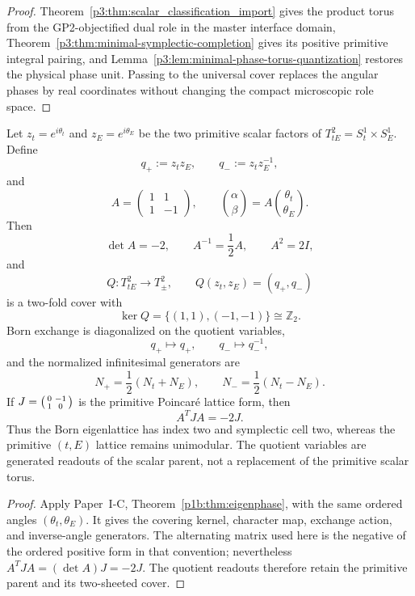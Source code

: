 \documentclass[12pt,a4paper]{article}
\begin{document}
\begin{proof}
Theorem~\ref{p3:thm:scalar_classification_import} gives the product torus from
the GP2-objectified dual role in the master interface domain,
Theorem~\ref{p3:thm:minimal-symplectic-completion} gives its positive
primitive integral pairing, and
Lemma~\ref{p3:lem:minimal-phase-torus-quantization} restores the physical phase
unit.  Passing to the universal cover replaces the angular phases by real
coordinates without changing the compact microscopic role space.
\end{proof}


\begin{theorem}
\label{p3a:thm:v190-scalar-born-eigenphase-cover}
Let $z_t=e^{i\theta_t}$ and $z_E=e^{i\theta_E}$ be the two primitive
scalar factors of $T^2_{tE}=S_t^1\times S_E^1$.  Define
\[
 q_+:=z_tz_E,\qquad q_-:=z_tz_E^{-1},
\]
and
\[
 A=\begin{pmatrix}1&1\\1&-1\end{pmatrix},\qquad
 \binom{\alpha}{\beta}=A\binom{\theta_t}{\theta_E}.
\]
Then
\[
 \det A=-2,\qquad A^{-1}=\frac12A,\qquad A^2=2I,
\]
and
\[
 Q:T^2_{tE}\longrightarrow T^2_{\pm},\qquad
 Q(z_t,z_E)=(q_+,q_-)
\]
is a two-fold cover with
\[
 \boxed{\ker Q=\{(1,1),(-1,-1)\}\cong\mathbb Z_2.}
\]
Born exchange is diagonalized on the quotient variables,
\[
 q_+\longmapsto q_+,\qquad q_-\longmapsto q_-^{-1},
\]
and the normalized infinitesimal generators are
\[
 \boxed{N_+=\frac12(N_t+N_E),\qquad
 N_-=\frac12(N_t-N_E).}
\]
If $J=\begin{psmallmatrix}0&-1\\1&0\end{psmallmatrix}$ is the primitive
Poincar\'e lattice form, then
\[
 \boxed{A^TJA=-2J.}
\]
Thus the Born eigenlattice has index two and symplectic cell two, whereas the
primitive $(t,E)$ lattice remains unimodular.  The quotient variables are
generated readouts of the scalar parent, not a replacement of the primitive
scalar torus.
\end{theorem}

\begin{proof}
Apply Paper~I-C, Theorem~\ref{p1b:thm:eigenphase}, with the same
ordered angles $(\theta_t,\theta_E)$. It gives the covering kernel,
character map, exchange action, and inverse-angle generators. The
alternating matrix used here is the negative of the ordered positive
form in that convention; nevertheless $A^TJA=(\det A)J=-2J$.
The quotient readouts therefore retain the primitive parent and its
two-sheeted cover.
\end{proof}
\end{document}
